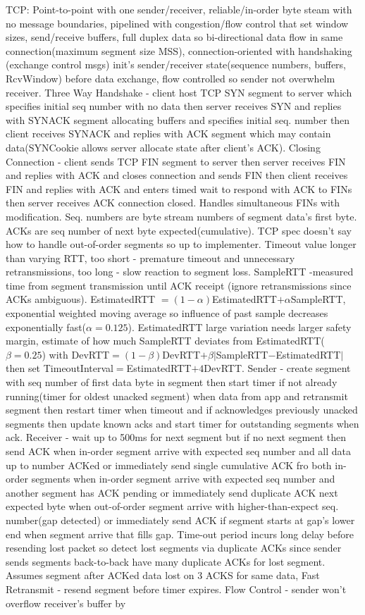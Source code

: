 \documentclass[9pt]{extarticle}
\begin{document}
\begin{multicols}{2}
TCP: Point-to-point with one sender/receiver, reliable/in-order byte steam with no message boundaries, pipelined with congestion/flow control that set window sizes, send/receive buffers, full duplex data so bi-directional data flow in same connection(maximum segment size MSS), connection-oriented with handshaking (exchange control msgs) init’s sender/receiver state(sequence numbers, buffers, RcvWindow) before data exchange, flow controlled so sender not overwhelm receiver. Three Way Handshake - client host TCP SYN segment to server which specifies initial seq number with no data then server receives SYN and replies with SYNACK segment allocating buffers and specifies initial seq. number then client receives SYNACK and replies with ACK segment which may contain data(SYNCookie allows server allocate state after client's ACK). Closing Connection - client sends TCP FIN segment to server then server receives FIN and replies with ACK and closes connection and sends FIN then client receives FIN and replies with ACK and enters timed wait to respond with ACK to FINs then server receives ACK connection closed. Handles simultaneous FINs with modification. Seq. numbers are byte stream numbers of segment data's first byte. ACKs are seq number of next byte expected(cumulative). TCP spec doesn’t say how to handle out-of-order segments so up to implementer. Timeout value longer than varying RTT, too short - premature timeout and unnecessary retransmissions, too long - slow reaction to segment loss. SampleRTT -measured time from segment transmission until ACK receipt (ignore retransmissions since ACKs ambiguous). EstimatedRTT $= (1-\alpha)$EstimatedRTT$+ \alpha$SampleRTT, exponential weighted moving average so influence of past sample decreases exponentially fast($\alpha{=0.125}$).  EstimatedRTT large variation needs larger safety margin, estimate of how much SampleRTT deviates from EstimatedRTT($\beta{=0.25}$) with DevRTT$=(1-\beta)$DevRTT$+\beta{|}$SampleRTT$-$EstimatedRTT$|$ then set TimeoutInterval$=$EstimatedRTT$+4$DevRTT. Sender - create segment with seq number of first data byte in segment then start timer if not already running(timer for oldest unacked segment) when data from app and retransmit segment then restart timer when timeout and if acknowledges previously unacked segments then update known acks and start timer for outstanding segments when ack. Receiver - wait up to 500ms for next segment but if no next segment then send ACK when in-order segment arrive with expected seq number and all data up to number ACKed or immediately send single cumulative ACK fro both in-order segments when in-order segment arrive with expected seq number and another segment has ACK pending or immediately send duplicate ACK next expected byte when out-of-order segment arrive with higher-than-expect seq. number(gap detected) or immediately send ACK if segment starts at gap's lower end when segment arrive that fills gap. Time-out period incurs long delay before resending lost packet so detect lost segments via duplicate ACKs since sender sends segments back-to-back have many duplicate ACKs for lost segment. Assumes segment after ACKed data lost on 3 ACKS for same data, Fast Retransmit  - resend segment before timer expires. Flow Control - sender won’t overflow receiver’s buffer by 
\end{multicols}
\end{document}
